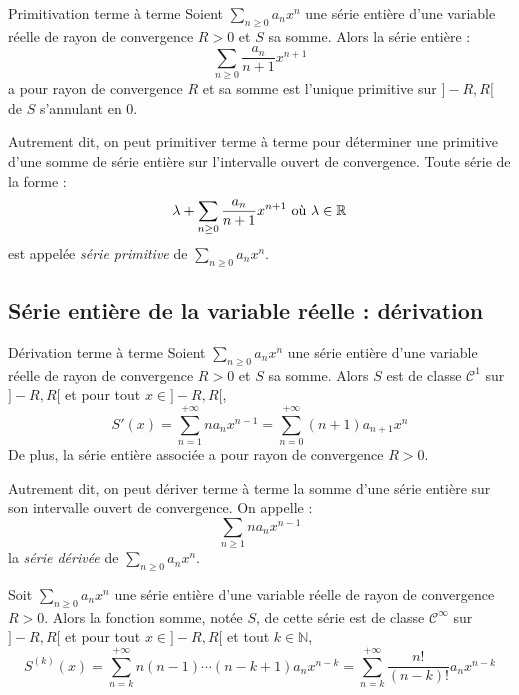 \documentclass[french,11pt,twoside]{VcCours}
\begin{document}
\begin{Theoreme}{Primitivation terme à terme}
Soient $\sum_{n \geq 0} a_n x^n$ une série entière d'une variable réelle de rayon de convergence $R>0$ et $S$ sa somme. Alors la série entière :
$$ \sum_{n \geq 0}  \dfrac{a_n}{n+1} x^{n+1}$$
a pour rayon de convergence $R$ et sa somme est l'unique primitive sur $]-R,R[$ de $S$ s'annulant en $0$.
\end{Theoreme}

Autrement dit, on peut \og{} primitiver \fg{} terme à terme pour déterminer une primitive d'une somme de série entière sur l'intervalle ouvert de convergence. Toute série de la forme :
$$ \lambda + \sum_{n\geq 0}  \dfrac{a_n}{n+1} x^{n+1} \hbox{ où } \lambda \in \mathbb{R}$$
est appelée \emph{série primitive} de $\sum_{n \geq 0} a_n x^n$.

\begin{Demonstration}{}

\vspace*{7cm}
\end{Demonstration}



\subsection{Série entière de la variable réelle : dérivation}

\begin{Theoreme}{Dérivation terme à terme}
Soient $\sum_{n \geq 0} a_n x^n$ une série entière d'une variable réelle de rayon de convergence $R>0$ et $S$ sa somme. Alors $S$ est de classe $\mathcal{C}^1$ sur $]-R,R[$ et pour tout $x \in ]-R,R[$,
$$S'(x) = \sum_{n=1}^{+ \infty} n a_n x^{n-1} = \sum_{n=0}^{+ \infty} (n+1) a_{n+1} x^n$$
De plus, la série entière associée a pour rayon de convergence $R>0$.
\end{Theoreme}

Autrement dit, on peut dériver terme à terme la somme d'une série entière sur son intervalle ouvert de convergence. On appelle :
$$ \sum_{n \geq 1} n a_n x^{n-1}$$
la \emph{série dérivée} de $\sum_{n \geq 0} a_n x^n$.

\begin{Demonstration}{}
\vspace*{ 6cm}
\end{Demonstration}
%
%
%
\begin{Theoreme}{} Soit $\sum_{n \geq 0} a_n x^n$ une série entière d'une variable réelle de rayon de convergence $R>0$. Alors la fonction somme, notée $S$, de cette série est de classe $\mathcal{C}^{\infty}$ sur $]-R,R[$ et pour tout $x \in ]-R,R[$ et tout $k \in \mathbb{N}$,
$$S^{(k)}(x) = \sum_{n=k}^{+ \infty} n(n-1)\cdots(n-k+1) a_n x^{n-k} = \sum_{n=k}^{+ \infty} \frac{n!}{(n-k)!} a_n x^{n-k}$$
\end{Theoreme}
\end{document}
